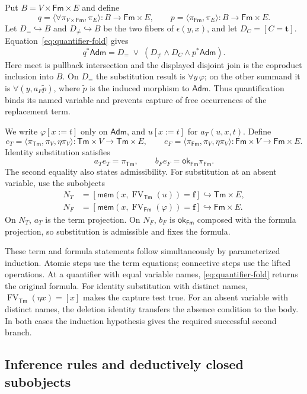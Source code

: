 \documentclass[11pt]{article}
\theoremstyle{definition}\newtheorem{definition}[theorem]{Definition}
\newcommand{\Tm}{\mathsf{Tm}}
\newcommand{\Fm}{\mathsf{Fm}}
\newcommand{\FV}{\operatorname{FV}}
\newcommand{\Adm}{\mathsf{Adm}}
\newcommand{\mem}{\mathsf{mem}}
\newcommand{\ok}{\mathsf{ok}}
\begin{document}
Put $B=V\times\Fm\times E$ and define
\[
 q=\langle\forall\pi_{V\times\Fm},\pi_E\rangle:B\to\Fm\times E,
 \qquad
 p=\langle\pi_{\Fm},\pi_E\rangle:B\to\Fm\times E.
\]
Let $D_=\hookrightarrow B$ and $D_{\ne}\hookrightarrow B$ be the
two fibers of $\epsilon(y,x)$, and let $D_C=[C=\mathbf{t}]$.
Equation~\eqref{eq:quantifier-fold} gives
\begin{equation}\label{eq:admissibility-subobjects}
 q^*\Adm=D_=\;\vee\;
           (D_{\ne}\wedge D_C\wedge p^*\Adm).
\end{equation}
Here meet is pullback intersection and the displayed disjoint join
is the coproduct inclusion into $B$. On $D_=$ the substitution
result is $\forall y\,\varphi$; on the other summand it is
$\forall(y,a_F\widetilde p)$, where
$\widetilde p$ is the induced morphism to $\Adm$.
Thus quantification binds its named variable and prevents capture
of free occurrences of the replacement term.

We write $\varphi[x:=t]$ only on $\Adm$, and $u[x:=t]$ for
$a_T(u,x,t)$. Define
\[
 e_T=\langle\pi_{\Tm},\pi_V,\eta\pi_V\rangle:
          \Tm\times V\to\Tm\times E,
 \qquad
 e_F=\langle\pi_{\Fm},\pi_V,\eta\pi_V\rangle:
          \Fm\times V\to\Fm\times E.
\]
Identity substitution satisfies
\[
 a_Te_T=\pi_{\Tm},\qquad b_Fe_F=\ok_{\Fm}\pi_{\Fm}.
\]
The second equality also states admissibility. For substitution at
an absent variable, use the subobjects
\begin{align*}
 N_T&=[\mem(x,\FV_{\Tm}(u))=\mathbf{f}]
                            \hookrightarrow\Tm\times E,\\
 N_F&=[\mem(x,\FV_{\Fm}(\varphi))=\mathbf{f}]
                            \hookrightarrow\Fm\times E.
\end{align*}
On $N_T$, $a_T$ is the term projection. On $N_F$, $b_F$ is
$\ok_{\Fm}$ composed with the formula projection, so substitution
is admissible and fixes the formula.

These term and formula statements follow simultaneously by
parameterized induction. Atomic steps use the term equations;
connective steps use the lifted operations. At a quantifier with
equal variable names, \eqref{eq:quantifier-fold} returns the original
formula. For identity substitution with distinct names,
$\FV_{\Tm}(\eta x)=[x]$ makes the capture test true.
For an absent variable with distinct names, the deletion identity
transfers the absence condition to the body. In both cases the
induction hypothesis gives the required successful second branch.

\subsection{Inference rules and deductively closed subobjects}
\label{app:closed-subobjects}
\end{document}
